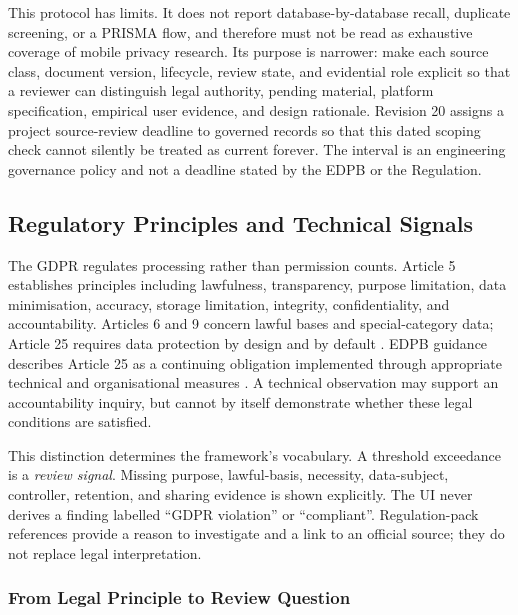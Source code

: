 This protocol has limits. It does not report database-by-database recall, duplicate screening, or a PRISMA flow, and therefore must not be read as exhaustive coverage of mobile privacy research. Its purpose is narrower: make each source class, document version, lifecycle, review state, and evidential role explicit so that a reviewer can distinguish legal authority, pending material, platform specification, empirical user evidence, and design rationale. Revision 20 assigns a project source-review deadline to governed records so that this dated scoping check cannot silently be treated as current forever. The interval is an engineering governance policy and not a deadline stated by the EDPB or the Regulation.

\subsection{Regulatory Principles and Technical Signals}

The GDPR regulates processing rather than permission counts. Article 5 establishes principles including lawfulness, transparency, purpose limitation, data minimisation, accuracy, storage limitation, integrity, confidentiality, and accountability. Articles 6 and 9 concern lawful bases and special-category data; Article 25 requires data protection by design and by default \cite{eurlex2016}. EDPB guidance describes Article 25 as a continuing obligation implemented through appropriate technical and organisational measures \cite{edpb2019}. A technical observation may support an accountability inquiry, but cannot by itself demonstrate whether these legal conditions are satisfied.

This distinction determines the framework's vocabulary. A threshold exceedance is a \emph{review signal}. Missing purpose, lawful-basis, necessity, data-subject, controller, retention, and sharing evidence is shown explicitly. The UI never derives a finding labelled ``GDPR violation'' or ``compliant''. Regulation-pack references provide a reason to investigate and a link to an official source; they do not replace legal interpretation.

\subsubsection{From Legal Principle to Review Question}

